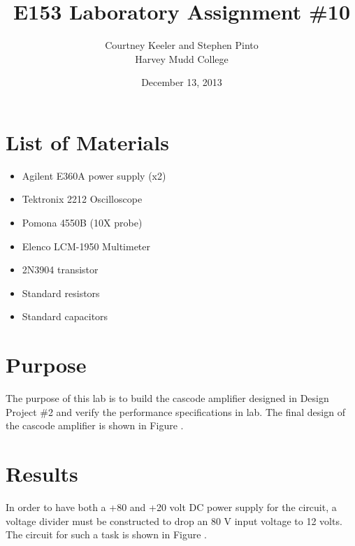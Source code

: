 \documentclass[12pt,letterpaper]{report}
\begin{document}
\title{E153 Laboratory Assignment \#10}
\author{Courtney Keeler and Stephen Pinto\\
Harvey Mudd College}
\date{December 13, 2013}
\maketitle

\section*{List of Materials}
\begin{itemize}
	\item Agilent E360A power supply (x2)
	\item Tektronix 2212 Oscilloscope
	\item Pomona 4550B (10X probe)
	\item Elenco LCM-1950 Multimeter
	\item 2N3904 transistor
	\item Standard resistors
	\item Standard capacitors
\end{itemize}

\section*{Purpose}
The purpose of this lab is to build the cascode amplifier designed in Design Project \#2 and verify the performance specifications in lab. The final design of the cascode amplifier is shown in Figure %
.

\section*{Results}

In order to have both a +80 and +20 volt DC power supply for the circuit, a voltage divider must be constructed to drop an 80 V input voltage to 12 volts. The circuit for such a task is shown in Figure %
.

\end{document}
